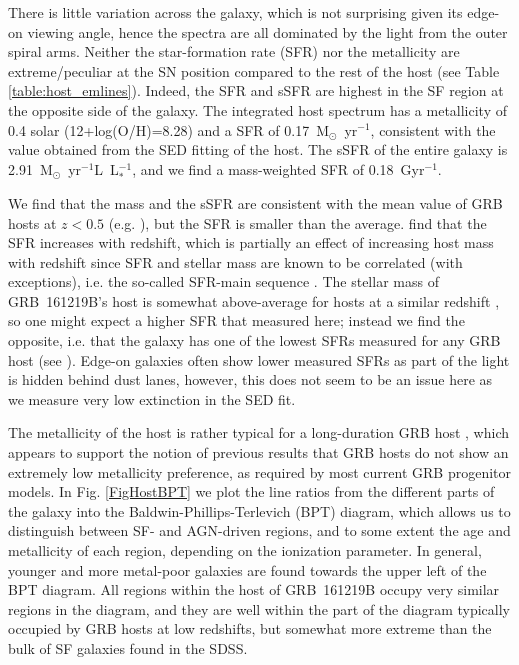 \documentclass[traditabstract,longauth]{aa}
\begin{document}
There is little variation across the galaxy, which is not surprising given its edge-on viewing angle, hence the spectra are all dominated by the light from the outer spiral arms. Neither the star-formation rate (SFR) nor the metallicity are extreme/peculiar at the SN position compared to the rest of the host (see Table \ref{table:host_emlines}). Indeed, the SFR and sSFR are highest in the SF region at the opposite side of the galaxy. The integrated host spectrum has a metallicity of 0.4 solar (12+log(O/H)=8.28) and a SFR of 0.17~M$_{\odot}$~yr$^{-1}$, consistent with the value obtained from the SED fitting of the host. The sSFR of the entire galaxy is 2.91~M$_{\odot}$~yr$^{-1}$L~L$_{*}^{-1}$, and we find a mass-weighted SFR of 0.18~Gyr$^{-1}$.

We find that the mass and the sSFR are consistent with the mean value of GRB hosts at $z<0.5$ (e.g. \citealt{Perley16,Schulze16}), but the SFR is smaller than the average. \cite{Kruehler15} find that the SFR increases with redshift, which is partially an effect of increasing host mass with redshift since SFR and stellar mass are known to be correlated (with exceptions), i.e. the so-called SFR-main sequence \cite[e.g.][for low and high redshifts respectively]{Elbaz07,Bouwens12}. The stellar mass of GRB~161219B's host is somewhat above-average for hosts at a similar redshift \cite[see e.g.][]{Kruehler15,Perley16,VerganiBAT6}, so one might expect a higher SFR that measured here; instead we find the opposite, i.e. that the galaxy has one of the lowest SFRs measured for any GRB host (see \citealt{Kruehler15}). Edge-on galaxies often show lower measured SFRs as part of the light is hidden behind dust lanes, however, this does not seem to be an issue here as we measure very low extinction in the SED fit. 

The metallicity of the host is rather typical for a long-duration GRB host \citep{Kruehler15}, which appears to support the notion of previous results that GRB hosts do not show an extremely low metallicity preference, as required by most current GRB progenitor models. In Fig. \ref{FigHostBPT} we plot the line ratios from the different parts of the galaxy into the Baldwin-Phillips-Terlevich (BPT) diagram, which allows us to distinguish between SF- and AGN-driven regions, and to some extent the age and metallicity of each region, depending on the ionization parameter. In general, younger and more metal-poor galaxies are found towards the upper left of the BPT diagram. All regions within the host of GRB~161219B occupy very similar regions in the diagram, and they are well within the part of the diagram typically occupied by GRB hosts at low redshifts, but somewhat more extreme than the bulk of SF galaxies found in the SDSS.
\end{document}
